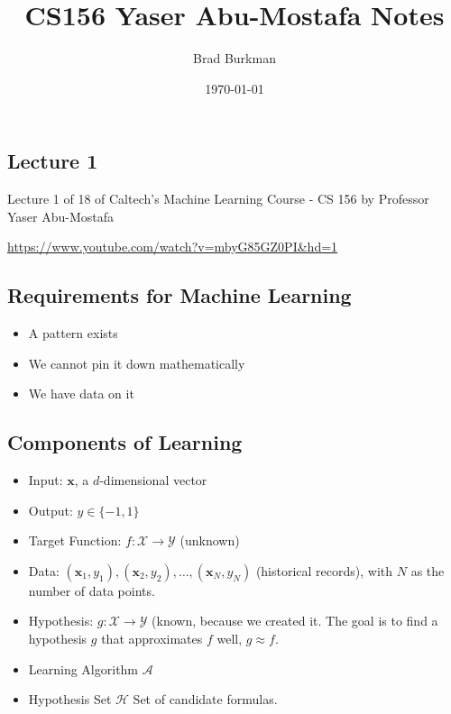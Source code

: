 \documentclass[11pt]{article}
\title{CS156 Yaser Abu-Mostafa Notes}
\author{Brad Burkman}
\date{\today}
\begin{document}
\setlength{\parindent}{20pt}
\begin{spacing}{1.2}
\maketitle

\tableofcontents


\section{Lecture 1}

Lecture 1 of 18 of Caltech's Machine Learning Course - CS 156 by Professor Yaser Abu-Mostafa

\url{https://www.youtube.com/watch?v=mbyG85GZ0PI&hd=1}

\subsection{Requirements for Machine Learning}

\begin{itemize}
	\item A pattern exists
	\item We cannot pin it down mathematically
	\item We have data on it
\end{itemize}

\subsection{Components of Learning}

\begin{itemize}
	\item Input:  $\mathbf{x}$, a $d$-dimensional vector
	\item Output: $y \in \{-1,1\}$
	\item Target Function: $f: \mathcal{X} \to \mathcal{Y}$ (unknown)
	\item Data:  $(\mathbf{x}_1, y_1), (\mathbf{x}_2, y_2), \dots, (\mathbf{x}_N, y_N)$ (historical records), with $N$ as the number of data points.
	\item Hypothesis:  $g: \mathcal{X} \to \mathcal{Y}$ (known, because we created it.  The goal is to find a hypothesis $g$ that approximates $f$ well, $g \approx f$.
	\item Learning Algorithm $\mathcal{A}$
	\item Hypothesis Set $\mathcal{H}$ Set of candidate formulas.
\end{itemize}


\end{spacing}
\end{document}
